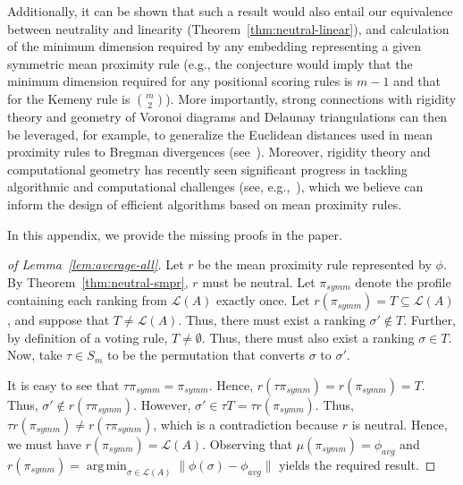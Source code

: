 \documentclass[prodmode,acmec]{ec-acmsmall}
\newcommand{\calL}{{\mathcal{L}}}
\newcommand{\rank}{{\calL(A)}}
\DeclareMathOperator*{\argmin}{arg\,min}
\begin{document}
Additionally, it can be shown that such a result would also entail our equivalence between neutrality and linearity (Theorem~\ref{thm:neutral-linear}), and calculation of the minimum dimension required by any embedding representing a given symmetric mean proximity rule (e.g., the conjecture would imply that the minimum dimension required for any positional scoring rules is $m-1$ and that for the Kemeny rule is $\binom{m}{2}$).  More importantly, strong connections with rigidity theory and geometry of Voronoi diagrams and Delaunay triangulations can then be leveraged, for example, to generalize the Euclidean distances used in mean proximity rules to Bregman divergences (see~\cite{boissonnat2010bregman}). Moreover, rigidity theory and computational geometry has recently seen significant progress in tackling algorithmic and computational challenges (see, e.g.,~\cite{biedl2007cauchy}), which we believe can inform the design of efficient algorithms based on mean proximity rules. 






\elecappendix
\medskip

In this appendix, we provide the missing proofs in the paper.

\begin{proof}[of Lemma~\ref{lem:average-all}]
Let $r$ be the mean proximity rule represented by $\phi$. By Theorem~\ref{thm:neutral-smpr}, $r$ must be neutral. Let $\pi_{symm}$ denote the profile containing each ranking from $\rank$ exactly once. Let $r(\pi_{symm}) = T \subseteq \rank$, and suppose that $T \neq \rank$. Thus, there must exist a ranking $\sigma' \notin T$. Further, by definition of a voting rule, $T \neq \emptyset$. Thus, there must also exist a ranking $\sigma \in T$. Now, take $\tau \in S_m$ to be the permutation that converts $\sigma$ to $\sigma'$. 

It is easy to see that $\tau \pi_{symm} = \pi_{symm}$. Hence, $r(\tau \pi_{symm}) = r(\pi_{symm}) = T$. Thus, $\sigma' \notin r(\tau \pi_{symm})$. However, $\sigma' \in \tau T = \tau r(\pi_{symm})$. Thus, $\tau r(\pi_{symm}) \neq r(\tau \pi_{symm})$, which is a contradiction because $r$ is neutral. Hence, we must have $r(\pi_{symm}) = \rank$. Observing that $\mu(\pi_{symm}) = \phi_{avg}$ and $r(\pi_{symm}) = \argmin_{\sigma \in \rank} \|\phi(\sigma)-\phi_{avg}\|$ yields the required result.
\end{proof}
\end{document}
